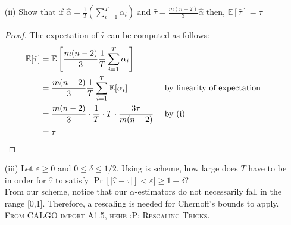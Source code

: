 \documentclass[a4paper, 11pt]{article}
\begin{document}
\begin{itemize}
\begin{proof}
\begin{proof}
in this case, I assume we treat $c(f_1)$ to be $n-2$ so it gives the probability $Pr[ w= w^*] = \frac{1}{m(n-2)}$
\end{proof}


Finally, we know that there can be 3 permutations  of edges for each of the triangle. This then yields the expectation of $\alpha$-estimator for a graph with $\tau$ triangles as follows:
$$
\mathbb{E}[\alpha] = \frac{ 3  \tau}{m(n-2)}
$$
\end{proof}
 \item[(ii)] Show that if $\hat{\alpha}  = \frac{1}{T} ( \sum_{i =1}^T \alpha_i)$ and $\hat{\tau} = \frac{m(n-2)}{3} \hat{\alpha}$ then, $\mathbb{E}[\hat{\tau}] = \tau$
 
 \begin{proof}
 The expectation of $\hat{\tau} $  can be computed as follows:
 \begin{align*}
\mathbb{E}[ \hat{\tau}] &=  \mathbb{E} \left[ \frac{m(n-2)}{3}  \frac{1}{T}  \sum_{i =1}^T \alpha_i \right]\\
&= \frac{m(n-2)}{3}  \frac{1}{T} \sum_{i =1}^T \mathbb{E}[ \alpha_i]  &&\textmd{ by linearity of expectation}\\
& = \frac{m(n-2)}{3} \cdot \frac{1}{T} \cdot T \cdot \frac{ 3 \tau}{m(n-2)} && \textmd{  by (i)}\\
& = \tau
 \end{align*}
 \end{proof}
 
 \item[(iii)] Let $\varepsilon \geq 0$ and $ 0 \leq \delta \leq 1/2$. Using is scheme, how large does $T$ have to be in order for $\hat{\tau}$ to satisfy $\Pr[|\hat{\tau} -\tau|] < \varepsilon] \geq 1 - \delta$?\\
 
 From our scheme, notice that our $\alpha$-estimators do not necessarily fall in the range [0,1]. Therefore, a rescaling is needed for Chernoff's bounds to apply. \\
 \textsc{From CALGO import A1.5, hehe :P: Rescaling Tricks.} \\


\end{itemize}
\end{document}
